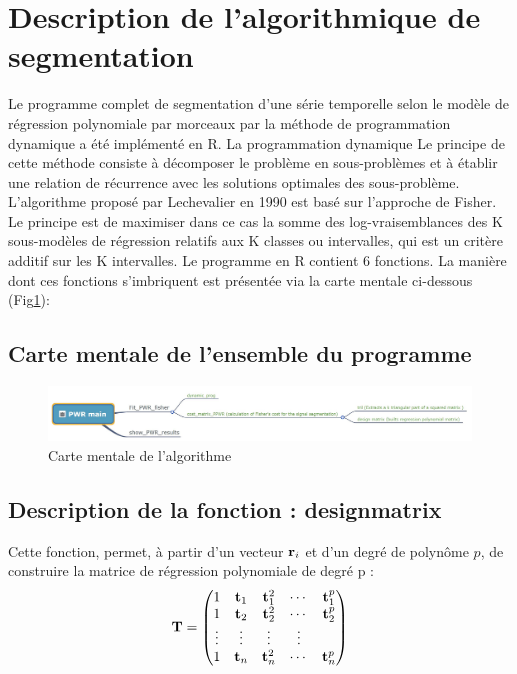 \documentclass[12pt]{article}
\begin{document}
\section{Description de l'algorithmique de segmentation}
\smallbreak
Le programme complet de segmentation d'une série temporelle selon le modèle de régression polynomiale par morceaux par la méthode de programmation dynamique a été implémenté en R. La programmation dynamique Le principe de cette méthode consiste à décomposer le problème en sous-problèmes et à établir une relation de récurrence avec les solutions optimales des sous-problème. L'algorithme proposé par Lechevalier en 1990 est basé sur l'approche de Fisher. Le principe est de maximiser dans ce cas la somme des log-vraisemblances des K sous-modèles de régression relatifs aux K classes ou intervalles, qui est un critère additif sur les K intervalles. 
Le programme en R contient 6 fonctions. La manière dont ces fonctions s'imbriquent est présentée via la carte mentale ci-dessous (Fig\ref{fig: mindmapping}):
\smallbreak
\smallbreak
\subsection{Carte mentale de l'ensemble du programme}
\label{ssec: CM}
\smallbreak
\begin{figure}[H] 
\includegraphics[scale=.6]{mindmapping.jpg}
\caption{\label{fig: mindmapping} Carte mentale de l'algorithme}
\end{figure} 
\smallbreak

\subsection{Description de la fonction : designmatrix }
\label{ssec: ssprog1}
\smallbreak
Cette fonction, permet, à partir d'un vecteur $\mathbf{r}_{i}$ et d'un degré de polynôme $p$, de construire la matrice de régression polynomiale de degré p :
$$
\mathbf{T}=\begin{pmatrix}
   1 & \mathbf{t}_{1} & \mathbf{t}^2_{1} & \cdots & \mathbf{t}^p_{1} \\
   1 & \mathbf{t}_{2} & \mathbf{t}^2_{2} & \cdots & \mathbf{t}^p_{2}  \\
   \vdots & \vdots &\vdots &\vdots\\
   1 & \mathbf{t}_{n} & \mathbf{t}^2_{n} & \cdots & \mathbf{t}^p_{n}  
\end{pmatrix}
$$
\end{document}
